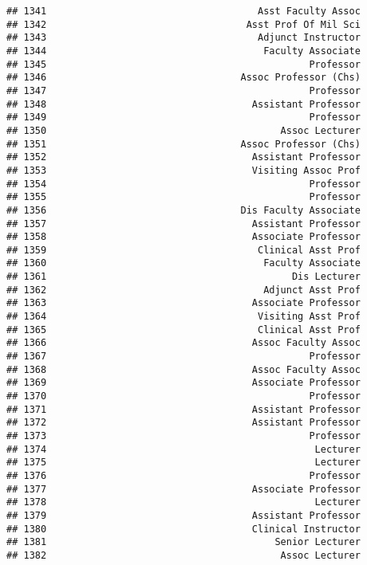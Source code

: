 \documentclass[
]{article}
\begin{document}
\begin{verbatim}
## 1341                                     Asst Faculty Assoc
## 1342                                   Asst Prof Of Mil Sci
## 1343                                     Adjunct Instructor
## 1344                                      Faculty Associate
## 1345                                              Professor
## 1346                                  Assoc Professor (Chs)
## 1347                                              Professor
## 1348                                    Assistant Professor
## 1349                                              Professor
## 1350                                         Assoc Lecturer
## 1351                                  Assoc Professor (Chs)
## 1352                                    Assistant Professor
## 1353                                    Visiting Assoc Prof
## 1354                                              Professor
## 1355                                              Professor
## 1356                                  Dis Faculty Associate
## 1357                                    Assistant Professor
## 1358                                    Associate Professor
## 1359                                     Clinical Asst Prof
## 1360                                      Faculty Associate
## 1361                                           Dis Lecturer
## 1362                                      Adjunct Asst Prof
## 1363                                    Associate Professor
## 1364                                     Visiting Asst Prof
## 1365                                     Clinical Asst Prof
## 1366                                    Assoc Faculty Assoc
## 1367                                              Professor
## 1368                                    Assoc Faculty Assoc
## 1369                                    Associate Professor
## 1370                                              Professor
## 1371                                    Assistant Professor
## 1372                                    Assistant Professor
## 1373                                              Professor
## 1374                                               Lecturer
## 1375                                               Lecturer
## 1376                                              Professor
## 1377                                    Associate Professor
## 1378                                               Lecturer
## 1379                                    Assistant Professor
## 1380                                    Clinical Instructor
## 1381                                        Senior Lecturer
## 1382                                         Assoc Lecturer

\end{verbatim}
\end{document}
